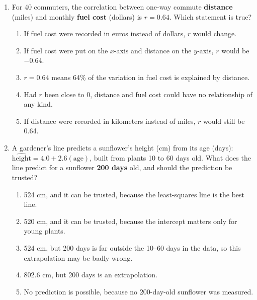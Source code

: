 \documentclass[12pt]{article}
\begin{document}
\begin{enumerate}[leftmargin=1.9em, itemsep=0.13in]
  \boxguard[10]
  \item For 40 commuters, the correlation between one-way commute \textbf{distance} (miles) and
        monthly \textbf{fuel cost} (dollars) is $r = 0.64$. Which statement is true?
        \begin{enumerate}[label=\textbf{(\Alph*)}, leftmargin=2.2em, itemsep=2pt]
          \item If fuel cost were recorded in euros instead of dollars, $r$ would change.
          \item If fuel cost were put on the $x$-axis and distance on the $y$-axis, $r$ would be
                $-0.64$.
          \item $r = 0.64$ means 64\% of the variation in fuel cost is explained by distance.\hfill{}\rule[-0.2in]{0pt}{0.48in}
          \item Had $r$ been close to 0, distance and fuel cost could have no relationship of
                any kind.
          \item If distance were recorded in kilometers instead of miles, $r$ would still be
                0.64.
        \end{enumerate}

  \boxguard[8]
  \item A gardener's line predicts a sunflower's height (cm) from its age (days):
        $\widehat{\text{height}} = 4.0 + 2.6(\text{age})$, built from plants 10 to 60 days old.
        What does the line predict for a sunflower \textbf{200 days} old, and should the
        prediction be trusted?
        \begin{enumerate}[label=\textbf{(\Alph*)}, leftmargin=2.2em, itemsep=2pt]
          \item 524 cm, and it can be trusted, because the least-squares line is the best line.
          \item 520 cm, and it can be trusted, because the intercept matters only for young
                plants.
          \item 524 cm, but 200 days is far outside the 10--60 days in the data, so this
                extrapolation may be badly wrong.
          \item 802.6 cm, but 200 days is an extrapolation.
          \item No prediction is possible, because no 200-day-old sunflower was measured.\hfill{}\rule[-0.2in]{0pt}{0.48in}
        \end{enumerate}


\end{enumerate}
\end{document}
